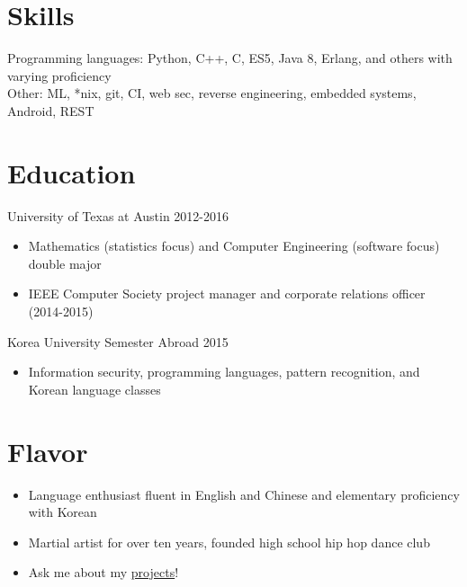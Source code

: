 \documentclass[line,margin]{res}
\begin{document}
\begin{resume}
\vspace{-8pt}
\section{Skills}
    \vspace{12pt} 
    Programming languages: Python, C++, C, ES5, Java 8, Erlang, and others with varying proficiency\\ 
    Other: ML, *nix, git, CI, web sec, reverse engineering, embedded systems, Android, REST


\vspace{-8pt}
\section{Education} 
    \vspace{12pt}
    University of Texas at Austin \hfill 2012-2016 \\
    \vspace{-12pt}
        \begin{itemize} \itemsep -2pt
        \item Mathematics (statistics focus) and Computer Engineering (software focus) double major
        \item IEEE Computer Society project manager and corporate relations officer (2014-2015)
        \end{itemize}
     
    \vspace{-8pt}
    Korea University Semester Abroad \hfill 2015 \\
    \vspace{-12pt}
        \begin{itemize} \itemsep -2pt
        \item Information security, programming languages, pattern recognition, and Korean language classes
        \end{itemize}

\vspace{-8pt}
\section{Flavor} 
    \vspace{22pt}
        \begin{itemize} \itemsep -2pt
        \item Language enthusiast fluent in English and Chinese and elementary proficiency with Korean
        \item Martial artist for over ten years, founded high school hip hop dance club
        \item Ask me about my \href{https://www.github.com/JDongian}{projects}!
        \end{itemize}

\end{resume} 
\end{document}
